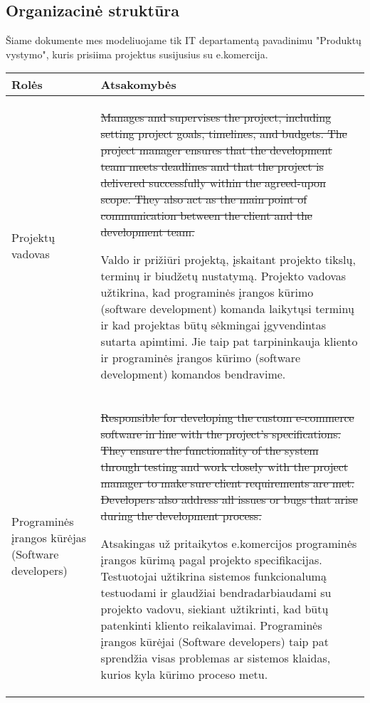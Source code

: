 \subsection{Organizacinė struktūra}
Šiame dokumente mes modeliuojame tik IT departamentą pavadinimu "Produktų vystymo", kuris prisiima projektus susijusius su e.komercija.
\begin{table}[h!]
\centering
\begin{tabular}{p{}|p{}}
\hline
\textbf{Rolės} & \textbf{Atsakomybės} \\ \hline



Projektų vadovas & \st{Manages and supervises the project, including setting project goals, timelines, and budgets. The project manager ensures that the development team meets deadlines and that the project is delivered successfully within the agreed-upon scope. They also act as the main point of communication between the client and the development team.}

Valdo ir prižiūri projektą, įskaitant projekto tikslų, terminų ir biudžetų nustatymą. Projekto vadovas užtikrina, kad programinės įrangos kūrimo (software development) komanda laikytųsi terminų ir kad projektas būtų sėkmingai įgyvendintas sutarta apimtimi. Jie taip pat tarpininkauja kliento ir programinės įrangos kūrimo (software development) komandos bendravime.

\\ \hline
Programinės įrangos kūrėjas (Software developers) & \st{ Responsible for developing the custom e-commerce software in line with the project's specifications. They ensure the functionality of the system through testing and work closely with the project manager to make sure client requirements are met. Developers also address all issues or bugs that arise during the development process. }

Atsakingas už pritaikytos e.komercijos programinės įrangos kūrimą pagal projekto specifikacijas. Testuotojai užtikrina sistemos funkcionalumą testuodami ir glaudžiai bendradarbiaudami su projekto vadovu, siekiant užtikrinti, kad būtų patenkinti kliento reikalavimai. Programinės įrangos kūrėjai (Software developers) taip pat sprendžia visas problemas ar sistemos klaidas, kurios kyla kūrimo proceso metu.
\\ \hline


\end{tabular}
\end{table}
